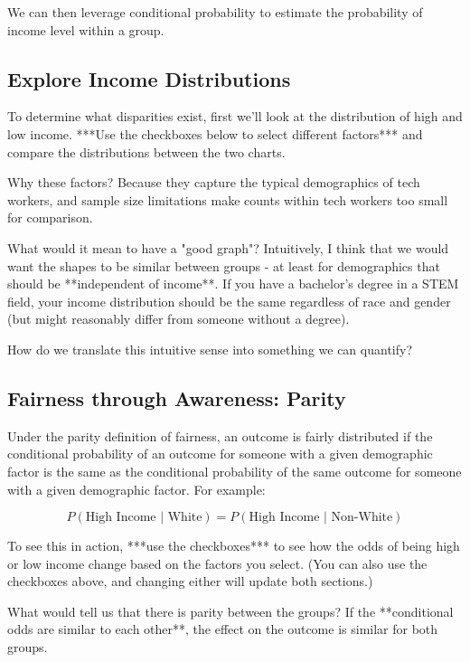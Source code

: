 \documentclass[12pt]{article}
\begin{document}
We can then leverage conditional probability\cite{piech:cond} to estimate the probability of income level within a group. 


\subsection*{Explore Income Distributions}

To determine what disparities exist, first we'll look at the distribution of high and low income. ***Use the checkboxes below to select different factors*** and compare the distributions between the two charts.

Why these factors? Because they capture the typical demographics of tech workers, and sample size limitations make counts within tech workers too small for comparison.

What would it mean to have a "good graph"? Intuitively, I think that we would want the shapes to be similar between groups - at least for demographics that should be **independent of income**. If you have a bachelor's degree in a STEM field, your income distribution should be the same regardless of race and gender (but might reasonably differ from someone without a degree).

How do we translate this intuitive sense into something we can quantify?



\subsection*{Fairness through Awareness: Parity}

Under the parity definition of fairness, an outcome is fairly distributed if the conditional probability of an outcome for someone with a given demographic factor is the same as the conditional probability of the same outcome for someone with a given demographic factor. For example:

$$P(\text{High Income | White}) = P(\text{High Income | Non-White})$$

To see this in action, ***use the checkboxes*** to see how the odds of being high or low income change based on the factors you select. (You can also use the checkboxes above, and changing either will update both sections.)

What would tell us that there is parity between the groups? If the **conditional odds are similar to each other**, the effect on the outcome is similar for both groups.
\end{document}
